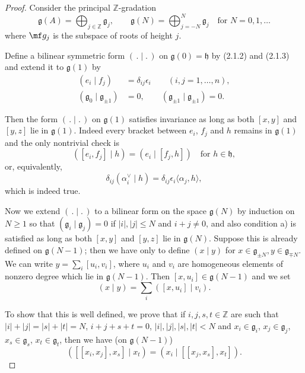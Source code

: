\documentclass[12pt]{article}
\begin{document}
\begin{proof}
    Consider the principal $\mathbb{Z}$-gradation
    \[
        \mathfrak{g}(A) = \bigoplus_{j \in \mathbb{Z}} \mathfrak{g}_j,
        \qquad
        \mathfrak{g}(N) = \bigoplus_{j=-N}^N \mathfrak{g}_j
        \quad \text{for } N=0,1,\ldots
    \] where $\mf g_j$ is the subspace of roots of height $j$.

    Define a bilinear symmetric form $(\,.\mid.\,)$ on $\mathfrak{g}(0) = \mathfrak{h}$ by (2.1.2) and (2.1.3)
    and extend it to $\mathfrak{g}(1)$ by
    \begin{align}
        (e_i \mid f_j)                             & = \delta_{ij} \epsilon_i \qquad (i,j=1,\ldots,n), \\
        (\mathfrak{g}_0 \mid \mathfrak{g}_{\pm 1}) & = 0, \qquad
        (\mathfrak{g}_{\pm 1} \mid \mathfrak{g}_{\pm 1}) = 0.
    \end{align}

    Then the form $(\,.\mid.\,)$ on $\mathfrak{g}(1)$ satisfies invariance as long as both $[x,y]$ and $[y,z]$ lie in $\mathfrak{g}(1)$. Indeed every bracket between $e_i$, $f_j$ and $h$ remains in $\mathfrak{g}(1)$ and the only nontrivial check is
    \[
        ([e_i,f_j]\mid h) = (e_i \mid [f_j,h]) \quad \text{for } h \in \mathfrak{h},
    \]
    or, equivalently,
    \[
        \delta_{ij}(\alpha_i^\vee \mid h) = \delta_{ij}\epsilon_i \langle \alpha_j,h \rangle,
    \]
    which is indeed true.

    Now we extend $(\,.\mid.\,)$ to a bilinear form on the space $\mathfrak{g}(N)$ by induction on $N\geq 1$
    so that $(\mathfrak{g}_i \mid \mathfrak{g}_j)=0$ if $|i|,|j|\leq N$ and $i+j\neq 0$, and also condition a)
    is satisfied as long as both $[x,y]$ and $[y,z]$ lie in $\mathfrak{g}(N)$. Suppose this is already defined on $\mathfrak{g}(N-1)$;
    then we have only to define $(x\mid y)$ for $x \in \mathfrak{g}_{\pm N}, y \in \mathfrak{g}_{\mp N}$.
    We can write $y = \sum_i [u_i,v_i]$, where $u_i$ and $v_i$ are homogeneous elements of nonzero degree which lie in $\mathfrak{g}(N-1)$.
    Then $[x,u_i] \in \mathfrak{g}(N-1)$ and we set
    \[
        (x \mid y) = \sum_i ([x,u_i] \mid v_i).
    \]





    To show that this is well defined, we prove that if $i,j,s,t \in \mathbb{Z}$ are such that
    $|i|+|j|=|s|+|t|=N$, $i+j+s+t=0$, $|i|,|j|,|s|,|t|<N$ and $x_i \in \mathfrak{g}_i$,
    $x_j \in \mathfrak{g}_j$, $x_s \in \mathfrak{g}_s$, $x_t \in \mathfrak{g}_t$, then we have (on $\mathfrak{g}(N-1)$)
    \[
        ([[x_i,x_j],x_s]\mid x_t) = (x_i \mid [[x_j,x_s],x_t]).
    \]


\end{proof}
\end{document}
